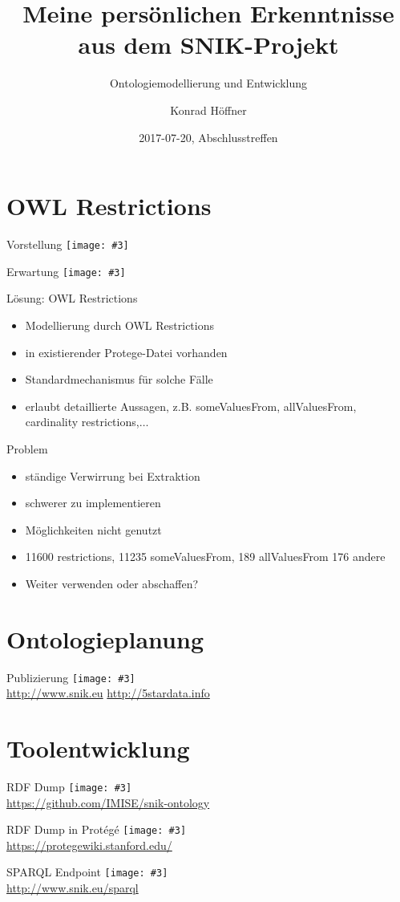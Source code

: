 \documentclass{beamer}
\author{Konrad Höffner}
\date{2017-07-20, Abschlusstreffen}
\title{Meine persönlichen Erkenntnisse aus dem SNIK-Projekt}
\subtitle{Ontologiemodellierung und Entwicklung}
\newcommand{\imageslide}[3][]
{
\begin{frame}{#2}
\centering\texttt{[image: \#3]}
\\#1
\end{frame}
}
\begin{document}
\begin{frame}
\titlepage
\end{frame}

\section{OWL Restrictions}

\imageslide{Vorstellung}{img/virtual.png}
\imageslide{Erwartung}{img/virtual-expectation.png}

\begin{frame}{Lösung: OWL Restrictions}
\begin{itemize}
\item Modellierung durch OWL Restrictions
\item in existierender Protege-Datei vorhanden
\item Standardmechanismus für solche Fälle
\item erlaubt detaillierte Aussagen, z.B. someValuesFrom, allValuesFrom, cardinality restrictions,$\ldots$
\end{itemize}
\end{frame}

\begin{frame}{Problem}
\begin{itemize}
\item ständige Verwirrung bei Extraktion 
\item schwerer zu implementieren
\item Möglichkeiten nicht genutzt
\item 11600 restrictions, 11235 someValuesFrom, 189 allValuesFrom 176 andere 
\item Weiter verwenden oder abschaffen?
\end{itemize}
\end{frame}

\section{Ontologieplanung}

\imageslide[\url{http://www.snik.eu} \url{http://5stardata.info}]{Publizierung}{../sniktec/img/5star.png}

\section{Toolentwicklung}
\imageslide[\url{https://github.com/IMISE/snik-ontology}]{RDF Dump}{../sniktec/img/rdfdump.png}
\imageslide[\url{https://protegewiki.stanford.edu/}]{RDF Dump in Protégé}{../sniktec/img/protege.png}
\imageslide[\url{http://www.snik.eu/sparql}]{SPARQL Endpoint}{../sniktec/img/sparqlresult.png}
\end{document}
